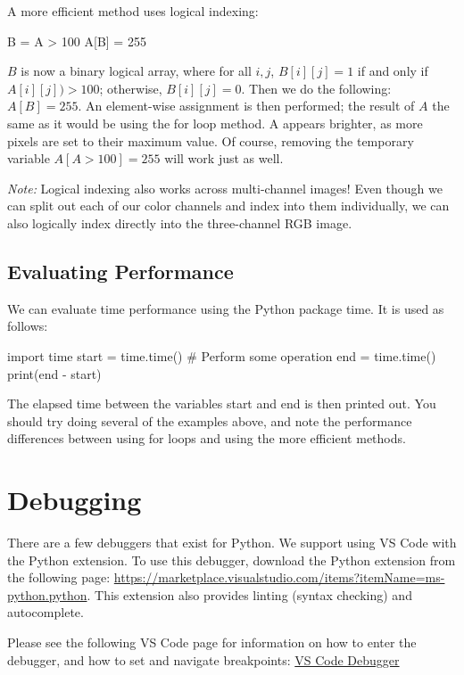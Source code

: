 \documentclass{article}
\begin{document}
A more efficient method uses logical indexing:
\begin{python}
B = A > 100
A[B] = 255
\end{python}

$B$ is now a binary logical array, where for all $i,j$, $B[i][j]=1$ if and only if $A[i][j]) > 100$; otherwise, $B[i][j]=0$. Then we do the following: $A[B] = 255$. An element-wise assignment is then performed; the result of $A$ the same as it would be using the for loop method. A appears brighter, as more pixels are set to their maximum value. Of course, removing the temporary variable $A[A > 100] = 255$ will work just as well.

\emph{Note:} Logical indexing also works across multi-channel images! Even though we can split out each of our color channels and index into them individually, we can also logically index directly into the three-channel RGB image.

\subsection{Evaluating Performance}
We can evaluate time performance using the Python package time. It is used as follows:
\begin{python}
import time
start = time.time()
# Perform some operation
end = time.time()
print(end - start)
\end{python}

The elapsed time between the variables start and end is then printed out. You should try doing several of the examples above, and note the performance differences between using for loops and using the more efficient methods.


\section{Debugging}
\label{sec:debugger}
There are a few debuggers that exist for Python. We support using VS Code with the Python extension.
To use this debugger, download the Python extension from the following page: \href{https://marketplace.visualstudio.com/items?itemName=ms-python.python}{https://marketplace.visualstudio.com/items?itemName=ms-python.python}. This extension also provides linting (syntax checking) and autocomplete.

Please see the following VS Code page for information on how to enter the debugger, and how to set and navigate breakpoints:
\href{https://code.visualstudio.com/docs/editor/debugging}{VS Code Debugger}
\end{document}
